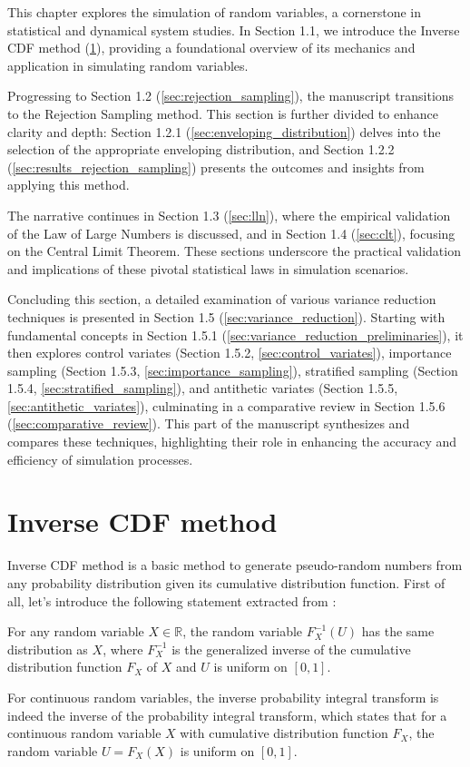 \documentclass{report}
\begin{document}
This chapter explores the simulation of random variables, a cornerstone in statistical and dynamical system studies. In Section 1.1, we introduce the Inverse CDF method (\ref{sec:inverse_cdf}), providing a foundational overview of its mechanics and application in simulating random variables.

Progressing to Section 1.2 (\ref{sec:rejection_sampling}), the manuscript transitions to the Rejection Sampling method. This section is further divided to enhance clarity and depth: Section 1.2.1 (\ref{sec:enveloping_distribution}) delves into the selection of the appropriate enveloping distribution, and Section 1.2.2 (\ref{sec:results_rejection_sampling}) presents the outcomes and insights from applying this method.

The narrative continues in Section 1.3 (\ref{sec:lln}), where the empirical validation of the Law of Large Numbers is discussed, and in Section 1.4 (\ref{sec:clt}), focusing on the Central Limit Theorem. These sections underscore the practical validation and implications of these pivotal statistical laws in simulation scenarios.

Concluding this section, a detailed examination of various variance reduction techniques is presented in Section 1.5 (\ref{sec:variance_reduction}). Starting with fundamental concepts in Section 1.5.1 (\ref{sec:variance_reduction_preliminaries}), it then explores control variates (Section 1.5.2, \ref{sec:control_variates}), importance sampling (Section 1.5.3, \ref{sec:importance_sampling}), stratified sampling (Section 1.5.4, \ref{sec:stratified_sampling}), and antithetic variates (Section 1.5.5, \ref{sec:antithetic_variates}), culminating in a comparative review in Section 1.5.6 (\ref{sec:comparative_review}). This part of the manuscript synthesizes and compares these techniques, highlighting their role in enhancing the accuracy and efficiency of simulation processes.

\section{Inverse CDF method}
\label{sec:inverse_cdf}

Inverse CDF method is a basic method to generate pseudo-random numbers from any probability distribution given its cumulative distribution function. First of all, let's introduce the following statement extracted from \cite{wikitInverseTransformSampling}:

\begin{theorem}
	For any random variable $X \in \mathbb{R}$, the random variable $F_X^{-1}(U)$ has the same distribution as $X$, where $F_X^{-1}$ is the generalized inverse of the cumulative distribution function $F_X$ of $X$ and $U$ is uniform on $[0,1]$.

	For continuous random variables, the inverse probability integral transform is indeed the inverse of the probability integral transform, which states that for a continuous random variable $X$ with cumulative distribution function $F_X$, the random variable $U = F_X(X)$ is uniform on $[0,1]$.
\end{theorem}
\end{document}
